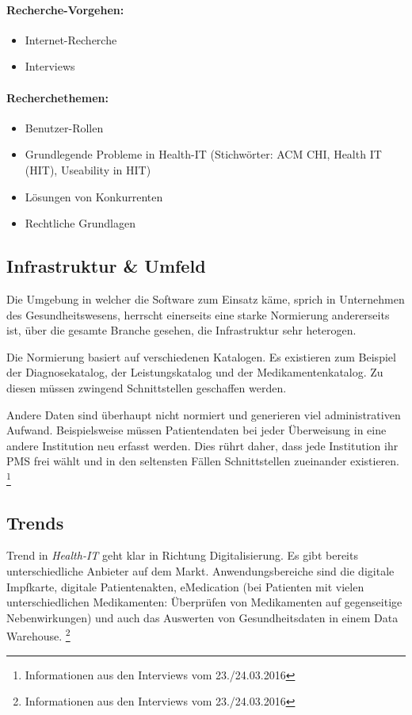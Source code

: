 \documentclass[a4paper]{scrreprt}
\begin{document}
\paragraph{Recherche-Vorgehen:} 
\begin{itemize}
\item Internet-Recherche
\item Interviews
\end{itemize}


\paragraph{Recherchethemen:}
\begin{itemize}
\item Benutzer-Rollen
\item Grundlegende Probleme in Health-IT (Stichwörter: ACM CHI, Health IT (HIT), Useability in HIT)
\item Lösungen von Konkurrenten
\item Rechtliche Grundlagen
\end{itemize}

\subsection{Infrastruktur \& Umfeld}
Die Umgebung in welcher die Software zum Einsatz käme, sprich in Unternehmen des Gesundheitswesens, herrscht einerseits eine starke Normierung andererseits ist, über die gesamte Branche gesehen, die Infrastruktur sehr heterogen.

Die Normierung basiert auf verschiedenen Katalogen. Es existieren zum Beispiel der Diagnosekatalog, der Leistungskatalog und der Medikamentenkatalog. Zu diesen müssen zwingend Schnittstellen geschaffen werden.

Andere Daten sind überhaupt nicht normiert und generieren viel administrativen Aufwand. Beispielsweise müssen Patientendaten bei jeder Überweisung in eine andere Institution neu erfasst werden. Dies rührt daher, dass jede Institution ihr PMS frei wählt und in den seltensten Fällen Schnittstellen zueinander existieren. \footnote{Informationen aus den Interviews vom 23./24.03.2016}


\subsection{Trends}
Trend in \textit{Health-IT} geht klar in Richtung Digitalisierung. Es gibt bereits unterschiedliche Anbieter auf dem Markt. Anwendungsbereiche sind die digitale Impfkarte, digitale Patientenakten, eMedication (bei Patienten mit vielen unterschiedlichen Medikamenten: Überprüfen von Medikamenten auf gegenseitige Nebenwirkungen) und auch das Auswerten von Gesundheitsdaten in einem Data Warehouse.
\footnote{Informationen aus den Interviews vom 23./24.03.2016}
\end{document}
